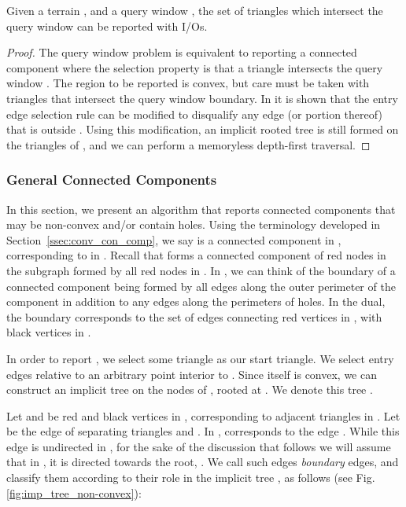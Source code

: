   \begin{corollary}\label{cor:window_query}
  Given a terrain , and a query window , the set of 
  triangles which intersect the query window can be 
  reported with  I/Os. 
  \end{corollary}

  \begin{proof}
  The query window problem is equivalent to reporting 
  a connected component where the selection property is that a triangle 
  intersects the query window . 
  The region to be reported is convex, but care must be taken with 
  triangles that intersect the query window boundary. 
  In \cite{DBLP:journals/gis/BergKOO97} it is shown that the entry edge selection 
  rule can be modified to disqualify any edge (or portion thereof) that 
  is outside . 
  Using this modification, an implicit rooted tree is still formed on 
  the triangles of , and we can perform a memoryless 
  depth-first traversal.
  \end{proof}

\subsubsection{General Connected Components}\label{ssec:gen_con_comp}


  In this section, we present an algorithm that reports connected components 
  that may be non-convex and/or contain holes.
  Using the terminology developed in Section~\ref{ssec:conv_con_comp}, we 
  say  is a connected component in , corresponding 
  to  in . 
  Recall that  forms a connected component of red nodes 
  in the subgraph formed by all red nodes in .
  In , we can think of the boundary of a connected component being 
  formed by all edges along the outer perimeter of the component 
  in addition to any edges along the perimeters of holes. 
  In the dual, the boundary corresponds to the set of edges connecting 
  red vertices in , with black vertices in . 

  In order to report , we select some triangle  as our
  start triangle. 
  We select entry edges relative to an arbitrary point interior to .
  Since  itself is convex, we can construct an implicit tree
  on the nodes of , rooted at .
  We denote this tree .
  
  Let  and  be red and black vertices in
  , corresponding to adjacent triangles in .
  Let  be the edge of  separating triangles  and .
  In ,  corresponds to the edge .
   While this edge is undirected in , for the sake of the
  discussion that follows we will assume that in , it
  is directed towards the root, .
  We call such edges \emph{boundary} edges, and classify them according
  to their role in the implicit tree , as follows 
  (see Fig.\ref{fig:imp_tree_non-convex}):
  
